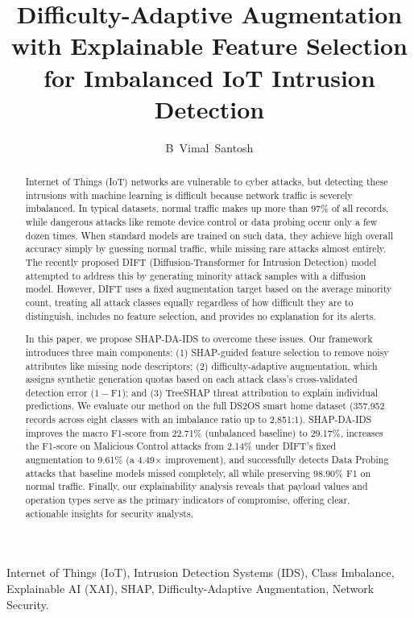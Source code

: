 \documentclass[journal]{IEEEtran}
\begin{document}
\title{Difficulty-Adaptive Augmentation with Explainable Feature Selection for Imbalanced IoT Intrusion Detection}

\author{B~Vimal~Santosh}

\maketitle

\begin{abstract}
Internet of Things (IoT) networks are vulnerable to cyber attacks, but detecting these intrusions with machine learning is difficult because network traffic is severely imbalanced. In typical datasets, normal traffic makes up more than 97\% of all records, while dangerous attacks like remote device control or data probing occur only a few dozen times. When standard models are trained on such data, they achieve high overall accuracy simply by guessing normal traffic, while missing rare attacks almost entirely. The recently proposed DIFT (Diffusion-Transformer for Intrusion Detection) model attempted to address this by generating minority attack samples with a diffusion model. However, DIFT uses a fixed augmentation target based on the average minority count, treating all attack classes equally regardless of how difficult they are to distinguish, includes no feature selection, and provides no explanation for its alerts.

In this paper, we propose SHAP-DA-IDS to overcome these issues. Our framework introduces three main components: (1) SHAP-guided feature selection to remove noisy attributes like missing node descriptors; (2) difficulty-adaptive augmentation, which assigns synthetic generation quotas based on each attack class's cross-validated detection error ($1 - \text{F1}$); and (3) TreeSHAP threat attribution to explain individual predictions. We evaluate our method on the full DS2OS smart home dataset (357,952 records across eight classes with an imbalance ratio up to 2,851:1). SHAP-DA-IDS improves the macro F1-score from 22.71\% (unbalanced baseline) to 29.17\%, increases the F1-score on Malicious Control attacks from 2.14\% under DIFT's fixed augmentation to 9.61\% (a 4.49$\times$ improvement), and successfully detects Data Probing attacks that baseline models missed completely, all while preserving 98.90\% F1 on normal traffic. Finally, our explainability analysis reveals that payload values and operation types serve as the primary indicators of compromise, offering clear, actionable insights for security analysts.
\end{abstract}

\begin{IEEEkeywords}
Internet of Things (IoT), Intrusion Detection Systems (IDS), Class Imbalance, Explainable AI (XAI), SHAP, Difficulty-Adaptive Augmentation, Network Security.
\end{IEEEkeywords}










\end{document}
